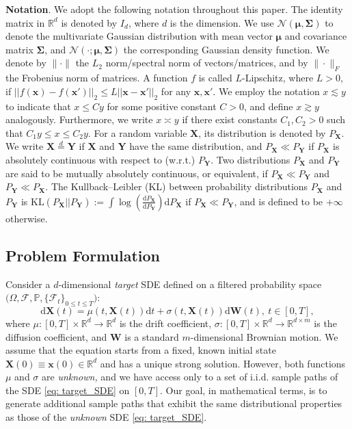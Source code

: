 \documentclass[11pt]{article}
\newcommand{\filterF}{\mathcal{F}}
\newcommand{\mR}{\mathbb{R}}
\newcommand{\bX}{\mathbf{X}}
\newcommand{\bY}{\mathbf{Y}}
\newcommand{\bx}{\mathbf{x}}
\newcommand{\bW}{\mathbf{W}}
\newcommand{\KL}{\text{KL}}
\newcommand{\intd}{\mathrm{d}}
\begin{document}
\textbf{Notation}. We adopt the following notation throughout this paper.
The identity matrix in $\mathbb{R}^d$ is denoted by $I_d$, where $d$ is the dimension.
We use $\mathcal{N}(\boldsymbol{\mu}, \boldsymbol{\Sigma})$ to denote the multivariate Gaussian distribution with mean vector $\boldsymbol{\mu}$ and covariance matrix $\boldsymbol{\Sigma}$, and $\mathcal{N}(\cdot; \boldsymbol{\mu}, \boldsymbol{\Sigma})$
the corresponding Gaussian density function.
We denote by $\|\cdot\|$ the $L_2$ norm/spectral norm of vectors/matrices, and by $\|\cdot\|_F$ the Frobenius norm of matrices. A function  $f$ is called $L$-Lipschitz, where $L>0$, if $||f( \bx) - f( \bx')||_2 \le L||\bx - \bx'||_2$ for any $\bx,\bx'$.
We employ the notation $x \lesssim y$ to indicate that $x \leq Cy$ for some positive constant $C > 0$, and define $x \gtrsim y$ analogously.
Furthermore, we write $x \asymp y$ if there exist constants $C_1, C_2 > 0$ such that $C_1y \leq x \leq C_2y$.
For a random variable $\bX$, its distribution is denoted by $P_\bX$. We write
$\bX \overset{d}{=} \bY$ if $\bX$ and $\bY$ have the same distribution, and $P_\bX \ll P_\bY$ if $P_\bX$ is absolutely continuous with respect to (w.r.t.) $P_\bY$. Two distributions $P_\bX$ and $P_\bY$ are said to be mutually absolutely continuous, or equivalent, if $P_\bX \ll P_\bY$ and $P_\bY \ll P_\bX$. The Kullback--Leibler (KL) between probability distributions $P_\bX$ and $P_\bY$ is
   $ \KL(P_\bX || P_\bY) := \int \log(\frac{\intd P_\bX}{\intd P_\bY}) \intd P_\bX$ if $P_\bX \ll P_\bY$, and is defined to be $+\infty$ otherwise.


\subsection{Problem Formulation}

Consider a $d$-dimensional \textit{target} SDE defined on a filtered probability space $\big(\Omega, \filterF, \mathbb{P}, \{\filterF_t\}_{0\le t\le T}\big)$:\begin{equation}\label{eq: target_SDE}
	\intd\bX(t) = \mu(t, \bX(t))\intd t + \sigma(t, \bX(t))\intd\bW(t),\ t \in [0, T],
\end{equation}
where $\mu: [0, T] \times \mR^d \to \mR^d$ is the drift coefficient, $\sigma: [0, T] \times \mR^d \to \mR^{d\times m}$ is the diffusion coefficient, and $\bW$ is a standard $m$-dimensional Brownian motion. We assume that the equation starts from a fixed, known initial state $\bX(0)\equiv \bx(0)\in\mR^d$ and has a unique strong solution. However, both functions $\mu$ and $\sigma$ are \textit{unknown,} and we have access only to a set of i.i.d. sample paths of the SDE \eqref{eq: target_SDE} on $[0, T]$. Our goal, in mathematical terms,  is to generate additional sample paths that exhibit the same distributional properties as those of the {\it unknown} SDE \eqref{eq: target_SDE}.
\end{document}
